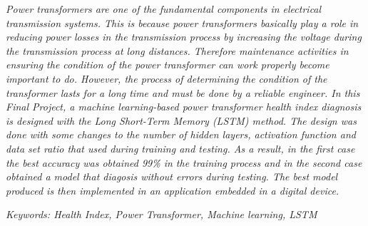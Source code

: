
\textit{Power transformers are one of the fundamental components in electrical transmission systems. This is because power transformers basically play a role in reducing power losses in the transmission process by increasing the voltage during the transmission process at long distances. Therefore maintenance activities in ensuring the condition of the power transformer can work properly become important to do. However, the process of determining the condition of the transformer lasts for a long time and must be done by a reliable engineer. 
In this Final Project, a machine learning-based power transformer health index diagnosis is designed with the Long Short-Term Memory (LSTM) method. The design was done with some changes to the number of hidden layers, activation function and data set ratio that used during training and testing. As a result, in the first case the best accuracy was obtained 99\% in the training process and in the second case obtained a model that diagosis without errors during testing. The best model produced is then implemented in an application embedded in a digital device.}

\textit{Keywords: Health Index, Power Transformer, Machine learning, LSTM}
